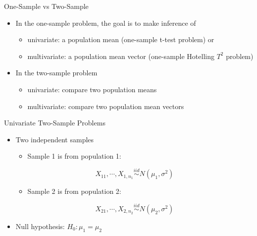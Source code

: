 \documentclass[
  ignorenonframetext,
]{beamer}
\providecommand{\tightlist}{%
  \setlength{\itemsep}{0pt}\setlength{\parskip}{0pt}}
\begin{document}
\begin{frame}{One-Sample vs Two-Sample}
\protect\hypertarget{one-sample-vs-two-sample}{}
\begin{itemize}
\tightlist
\item
  In the one-sample problem, the goal is to make inference of

  \begin{itemize}
  \tightlist
  \item
    univariate: a population mean (one-sample t-test problem) or
  \item
    multivariate: a population mean vector (one-sample Hotelling \(T^2\)
    problem)
  \end{itemize}
\item
  In the two-sample problem

  \begin{itemize}
  \tightlist
  \item
    univariate: compare two population means
  \item
    multivariate: compare two population mean vectors
  \end{itemize}
\end{itemize}
\end{frame}

\begin{frame}{Univariate Two-Sample Problems}
\protect\hypertarget{univariate-two-sample-problems}{}
\begin{itemize}
\tightlist
\item
  Two independent samples

  \begin{itemize}
  \tightlist
  \item
    Sample 1 is from population 1:
  \end{itemize}

  \[X_{11}, \cdots, X_{1,n_1}\overset{iid} \sim N(\mu_1,\sigma^2)\]

  \begin{itemize}
  \tightlist
  \item
    Sample 2 is from population 2:
  \end{itemize}

  \[X_{21}, \cdots, X_{2,n_2}\overset{iid} \sim N(\mu_2,\sigma^2)\]
\item
  Null hypothesis: \(H_0: \mu_1=\mu_2\)
\end{itemize}
\end{frame}
\end{document}
